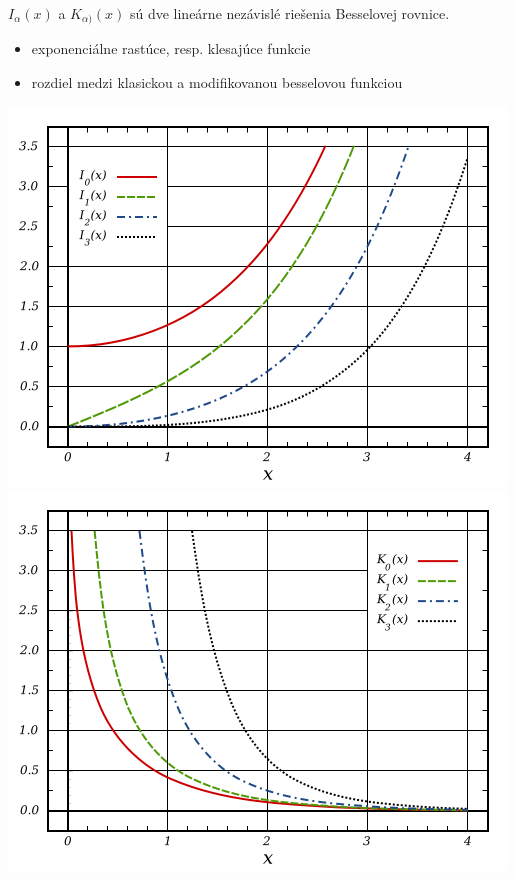 \documentclass{beamer}
\begin{document}
 \begin{frame}
$I_{\alpha}(x)$ a $K_{\alpha)}(x)$ sú dve lineárne nezávislé riešenia Besselovej rovnice.
\begin{itemize}
\item exponenciálne rastúce, resp. klesajúce funkcie
\item rozdiel medzi klasickou a modifikovanou besselovou funkciou
\end{itemize}
\includegraphics[scale=0.3]{bessel3.png} 
\includegraphics[scale=0.3]{bessel4.png} 
\end{frame}
\end{document}
